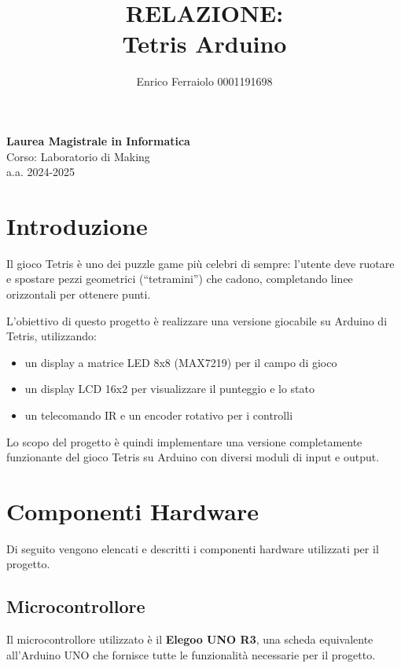 \documentclass[a4paper, 12pt]{article}
\title{\textbf{RELAZIONE: \\ Tetris Arduino}}
\author{Enrico Ferraiolo 0001191698}
\date{}
\begin{document}
    

    \maketitle
    
    \begin{center}
        \textbf{Laurea Magistrale in Informatica}\\
    \vspace{0.3cm}
    Corso: Laboratorio di Making\\
    a.a. 2024-2025
    \vspace{2cm}
\end{center}

\newpage

\tableofcontents
\newpage

\section{Introduzione}
\label{sec:introduzione}
Il gioco Tetris è uno dei puzzle game più celebri di sempre: l'utente deve ruotare e spostare pezzi geometrici (``tetramini'') che cadono,
completando linee orizzontali per ottenere punti.

L'obiettivo di questo progetto è realizzare una versione giocabile su Arduino di Tetris, utilizzando:
\begin{itemize}
    \item un display a matrice LED 8x8 (MAX7219) per il campo di gioco
    \item un display LCD 16x2 per visualizzare il punteggio e lo stato
    \item un telecomando IR e un encoder rotativo per i controlli
\end{itemize}

Lo scopo del progetto è quindi implementare una versione completamente funzionante del gioco Tetris su Arduino con diversi moduli di input e output.

\section{Componenti Hardware}
\label{sec:componenti-hardware}
Di seguito vengono elencati e descritti i componenti hardware utilizzati per il progetto.

\subsection{Microcontrollore}
\label{subsec:microcontrollore}
Il microcontrollore utilizzato è il \textbf{Elegoo UNO R3}, una scheda equivalente all'Arduino UNO che fornisce tutte le funzionalità necessarie per il progetto.
\end{document}
